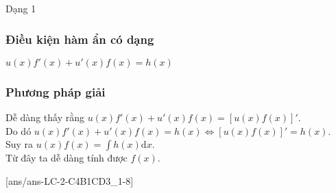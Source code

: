 \begin{dang}{Dạng 1}
\subsubsection{Điều kiện hàm ẩn có dạng}
	\centerline{$u(x)f'(x)+u'(x)f(x)=h(x)$}
\subsubsection*{Phương pháp giải}
	Dễ dàng thấy rằng $u(x)f'(x)+u'(x)f(x)=[u(x)f(x)]'$.\\
	Do dó $u(x)f'(x)+u'(x)f(x)=h(x) \Leftrightarrow [u(x)f(x)]'=h(x)$.\\
	Suy ra $u(x)f(x)=\displaystyle\int\!\! h(x)\mathrm{d}x$.\\
	Từ đây ta dễ dàng tính được $f(x)$.
\end{dang}

\TN
{}[ans/ans-LC-2-C4B1CD3_1-8]

